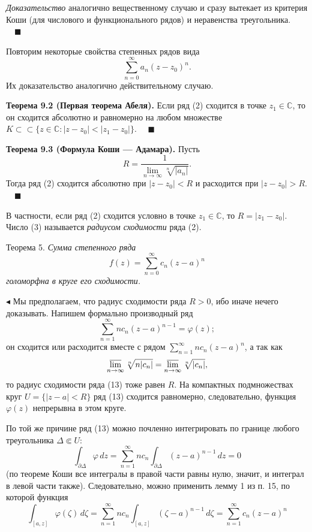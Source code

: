 \documentclass[12pt, a4paper]{article}
\theoremstyle{definition}
\theoremstyle{remark}
\begin{document}
\textit{Доказательство} аналогично вещественному случаю и сразу вытекает из критерия Коши (для числового и функционального рядов) и неравенства треугольника. $\quad \blacksquare$

Повторим некоторые свойства степенных рядов вида
\begin{equation}
	\sum_{n=0}^{\infty} a_n(z - z_0)^n.
\end{equation}
Их доказательство аналогично действительному случаю.

\textbf{Теорема 9.2 (Первая теорема Абеля).} Если ряд (2) сходится в точке $z_1 \in \mathbb{C}$, то он сходится абсолютно и равномерно на любом множестве $K \subset\subset \{z \in \mathbb{C} : |z - z_0| < |z_1 - z_0|\}$. $\quad \blacksquare$

\textbf{Теорема 9.3 (Формула Коши — Адамара).} Пусть
\begin{equation}
	R = \frac{1}{\lim\limits_{n \to \infty} \sqrt[n]{|a_n|}}.
\end{equation}
Тогда ряд (2) сходится абсолютно при $|z - z_0| < R$ и расходится при $|z - z_0| > R$. $\quad \blacksquare$

В частности, если ряд (2) сходится условно в точке $z_1 \in \mathbb{C}$, то $R = |z_1 - z_0|$. Число (3) называется \textit{радиусом сходимости} ряда (2).

Теорема 5. \textit{Сумма степенного ряда}
\begin{equation}
	f(z) = \sum_{n=0}^{\infty} c_n (z - a)^n
	\tag{12}
\end{equation}
\textit{голоморфна в круге его сходимости.}

$\blacktriangleleft$ Мы предполагаем, что радиус сходимости ряда $R > 0$, ибо иначе нечего доказывать. Напишем формально производный ряд
\begin{equation}
	\sum_{n=1}^{\infty} n c_n (z - a)^{n-1} = \varphi(z);
	\tag{13}
\end{equation}
он сходится или расходится вместе с рядом $\sum_{n=1}^{\infty} n c_n (z - a)^n$, а так как
$$
\varlimsup_{n \to \infty} \sqrt[n]{n |c_n|} = \varlimsup_{n \to \infty} \sqrt[n]{|c_n|},
$$
то радиус сходимости ряда (13) тоже равен $R$. На компактных подмножествах круг $U = \{|z - a| < R\}$ ряд (13) сходится равномерно, следовательно, функция $\varphi(z)$ непрерывна в этом круге.

По той же причине ряд (13) можно почленно интегрировать по границе любого треугольника $\Delta \Subset U$:
$$
\int_{\partial \Delta} \varphi \, dz = \sum_{n=1}^{\infty} n c_n \int_{\partial \Delta} (z - a)^{n-1} \, dz = 0
$$
(по теореме Коши все интегралы в правой части равны нулю, значит, и интеграл в левой части также). Следовательно, можно применить лемму 1 из п. 15, по которой функция
$$
\int_{[a, z]} \varphi(\zeta) \, d\zeta = \sum_{n=1}^{\infty} n c_n \int_{[a, z]} (\zeta - a)^{n-1} \, d\zeta = \sum_{n=1}^{\infty} c_n (z - a)^n
$$
\end{document}
